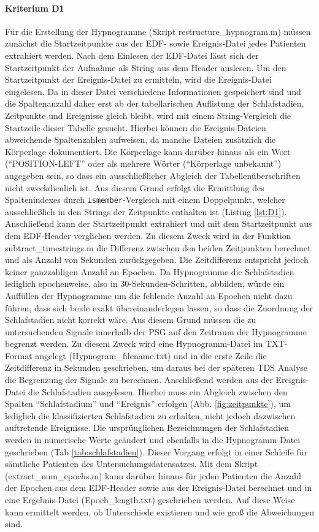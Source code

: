 \paragraph{Kriterium D1} Für die Erstellung der Hypnogramme (Skript restructure\_hypnogram.m) müssen zunächst die Startzeitpunkte aus der \acs{EDF}- sowie Ereignis-Datei jedes Patienten extrahiert werden. Nach dem Einlesen der EDF-Datei lässt sich der Startzeitpunkt der Aufnahme als String aus dem Header auslesen. Um den Startzeitpunkt der Ereignis-Datei zu ermitteln, wird die Ereignis-Datei eingelesen. Da in dieser Datei verschiedene Informationen gespeichert sind und die Spaltenanzahl daher erst ab der tabellarischen Auflistung der Schlafstadien, Zeitpunkte und Ereignisse gleich bleibt, wird mit einem String-Vergleich die Startzeile dieser Tabelle gesucht. Hierbei können die Ereignis-Dateien abweichende Spaltenzahlen aufweisen, da manche Dateien zusätzlich die Körperlage dokumentiert. Die Körperlage kann darüber hinaus als ein Wort ("`POSITION-LEFT"' oder als mehrere Wörter ("`Körperlage unbekannt"') angegeben sein, so dass ein ausschließlicher Abgleich der Tabellenüberschriften nicht zweckdienlich ist. Aus diesem Grund erfolgt die Ermittlung des Spaltenindexes durch \texttt{ismember}-Vergleich mit einem Doppelpunkt, welcher ausschließlich in den Strings der Zeitpunkte enthalten ist (Listing \ref{lst:D1}). Anschließend kann der Startzeitpunkt extrahiert und mit dem Startzeitpunkt aus dem \acs{EDF}-Header verglichen werden. Zu diesem Zweck wird in der Funktion subtract\_timestrings.m die Differenz zwischen den beiden Zeitpunkten berechnet und als Anzahl von Sekunden zurückgegeben. Die Zeitdifferenz entspricht jedoch keiner ganzzahligen Anzahl an Epochen. Da Hypnogramme die Schlafstadien lediglich epochenweise, also in 30-Sekunden-Schritten, abbilden, würde ein Auffüllen der Hypnogramme um die fehlende Anzahl an Epochen nicht dazu führen, dass sich beide exakt übereinanderlegen lassen, so dass die Zuordnung der Schlafstadien nicht korrekt wäre. Aus diesem Grund müssen die zu untersuchenden Signale innerhalb der \acs{PSG} auf den Zeitraum der Hypnogramme begrenzt werden. Zu diesem Zweck wird eine Hypnogramm-Datei im TXT-Format angelegt (Hypnogram\_filename.txt) und in die erste Zeile die Zeitdifferenz in Sekunden geschrieben, um daraus bei der späteren \acs{TDS} Analyse die Begrenzung der Signale zu berechnen. Anschließend werden aus der Ereignis-Datei die Schlafstadien ausgelesen. Hierbei muss ein Abgleich zwischen den Spalten "`Schlafstadium"' und "`Ereignis"' erfolgen (Abb. \ref{fig:zeitpunkte}), um lediglich die klassifizierten Schlafstadien zu erhalten, nicht jedoch dazwischen auftretende Ereignisse. Die ursprünglichen Bezeichnungen der Schlafstadien werden in numerische Werte geändert und ebenfalls in die Hypnogramm-Datei geschrieben (Tab \ref{tab:schlafstadien}). Dieser Vorgang erfolgt in einer Schleife für sämtliche Patienten des Untersuchungsdatensatzes. Mit dem Skript (extract\_num\_epochs.m) kann darüber hinaus für jeden Patienten die Anzahl der Epochen aus dem \acs{EDF}-Header sowie aus der Ereignis-Datei berechnet und in eine Ergebnis-Datei (Epoch\_length.txt) geschrieben werden. Auf diese Weise kann ermittelt werden, ob Unterschiede existieren und wie groß die Abweichungen sind.

